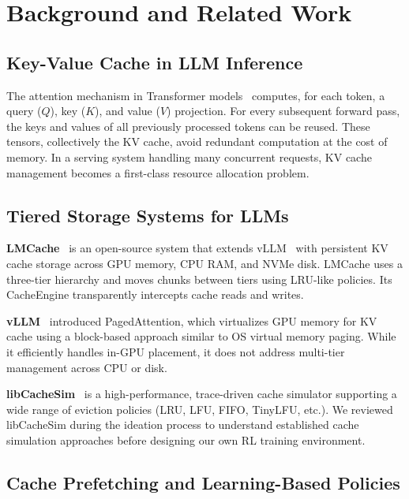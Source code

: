 \documentclass[conference]{IEEEtran}
\begin{document}
\section{Background and Related Work}

\subsection{Key-Value Cache in LLM Inference}

The attention mechanism in Transformer models~\cite{vaswani2017attention} computes, for each token, a query ($Q$), key ($K$), and value ($V$) projection. For every subsequent forward pass, the keys and values of all previously processed tokens can be reused. These tensors, collectively the KV cache, avoid redundant computation at the cost of memory. In a serving system handling many concurrent requests, KV cache management becomes a first-class resource allocation problem.

\subsection{Tiered Storage Systems for LLMs}

\textbf{LMCache}~\cite{liu2024cachegen} is an open-source system that extends vLLM~\cite{kwon2023efficient} with persistent KV cache storage across GPU memory, CPU RAM, and NVMe disk. LMCache uses a three-tier hierarchy and moves chunks between tiers using LRU-like policies. Its CacheEngine transparently intercepts cache reads and writes.

\textbf{vLLM}~\cite{kwon2023efficient} introduced PagedAttention, which virtualizes GPU memory for KV cache using a block-based approach similar to OS virtual memory paging. While it efficiently handles in-GPU placement, it does not address multi-tier management across CPU or disk.

\textbf{libCacheSim}~\cite{yang2023libcachesim} is a high-performance, trace-driven cache simulator supporting a wide range of eviction policies (LRU, LFU, FIFO, TinyLFU, etc.). We reviewed libCacheSim during the ideation process to understand established cache simulation approaches before designing our own RL training environment.

\subsection{Cache Prefetching and Learning-Based Policies}
\end{document}
